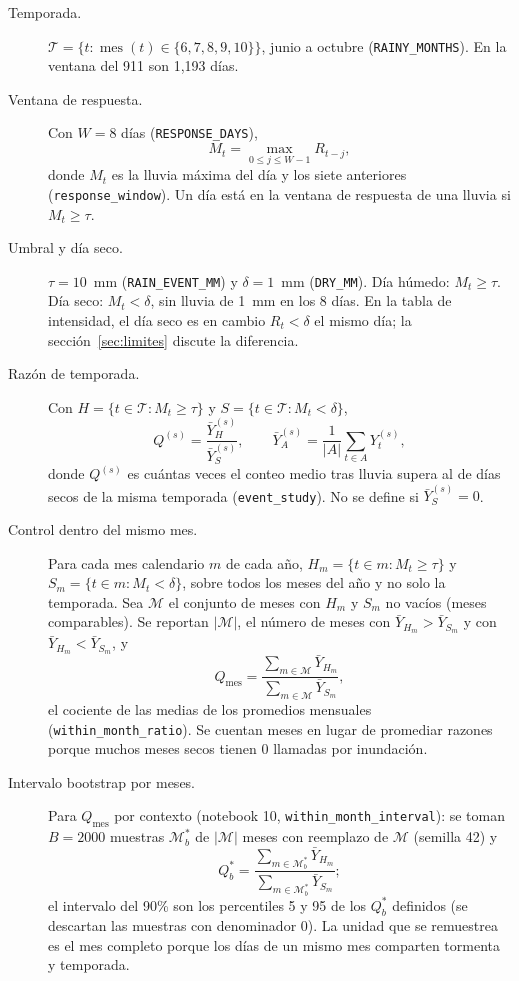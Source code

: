 \documentclass[11pt]{article}
\newcommand{\cod}[1]{\nolinkurl{#1}}
\begin{document}
\begin{description}
  \item[Temporada.] $\mathcal{T}=\{t:\operatorname{mes}(t)\in\{6,7,8,9,10\}\}$, junio a octubre (\cod{RAINY_MONTHS}). En la ventana del 911 son 1,193 días.
  \item[Ventana de respuesta.] Con $W=8$ días (\cod{RESPONSE_DAYS}),
  \[ M_t=\max_{0\le j\le W-1} R_{t-j}, \]
  donde $M_t$ es la lluvia máxima del día y los siete anteriores (\cod{response_window}). Un día está en la ventana de respuesta de una lluvia si $M_t\geq\tau$.
  \item[Umbral y día seco.] $\tau=10$~mm (\cod{RAIN_EVENT_MM}) y $\delta=1$~mm (\cod{DRY_MM}). Día húmedo: $M_t\ge\tau$. Día seco: $M_t<\delta$, sin lluvia de 1~mm en los 8 días. En la tabla de intensidad, el día seco es en cambio $R_t<\delta$ el mismo día; la sección~\ref{sec:limites} discute la diferencia.
  \item[Razón de temporada.] Con $H=\{t\in\mathcal{T}:M_t\ge\tau\}$ y $S=\{t\in\mathcal{T}:M_t<\delta\}$,
  \[ Q^{(s)}=\frac{\bar{Y}^{(s)}_H}{\bar{Y}^{(s)}_S},\qquad \bar{Y}^{(s)}_A=\frac{1}{|A|}\sum_{t\in A}Y^{(s)}_t, \]
  donde $Q^{(s)}$ es cuántas veces el conteo medio tras lluvia supera al de días secos de la misma temporada (\cod{event_study}). No se define si $\bar{Y}^{(s)}_S=0$.
  \item[Control dentro del mismo mes.] Para cada mes calendario $m$ de cada año, $H_m=\{t\in m:M_t\ge\tau\}$ y $S_m=\{t\in m:M_t<\delta\}$, sobre todos los meses del año y no solo la temporada. Sea $\mathcal{M}$ el conjunto de meses con $H_m$ y $S_m$ no vacíos (meses comparables). Se reportan $|\mathcal{M}|$, el número de meses con $\bar{Y}_{H_m}>\bar{Y}_{S_m}$ y con $\bar{Y}_{H_m}<\bar{Y}_{S_m}$, y
  \[ Q_{\text{mes}}=\frac{\sum_{m\in\mathcal{M}}\bar{Y}_{H_m}}{\sum_{m\in\mathcal{M}}\bar{Y}_{S_m}}, \]
  el cociente de las medias de los promedios mensuales (\cod{within_month_ratio}). Se cuentan meses en lugar de promediar razones porque muchos meses secos tienen 0 llamadas por inundación.
  \item[Intervalo bootstrap por meses.] Para $Q_{\text{mes}}$ por contexto (notebook 10, \cod{within_month_interval}): se toman $B=2000$ muestras $\mathcal{M}^{*}_b$ de $|\mathcal{M}|$ meses con reemplazo de $\mathcal{M}$ (semilla 42) y
  \[ Q^{*}_b=\frac{\sum_{m\in\mathcal{M}^{*}_b}\bar{Y}_{H_m}}{\sum_{m\in\mathcal{M}^{*}_b}\bar{Y}_{S_m}}; \]
  el intervalo del 90\% son los percentiles 5 y 95 de los $Q^{*}_b$ definidos (se descartan las muestras con denominador 0). La unidad que se remuestrea es el mes completo porque los días de un mismo mes comparten tormenta y temporada.

\end{description}
\end{document}
